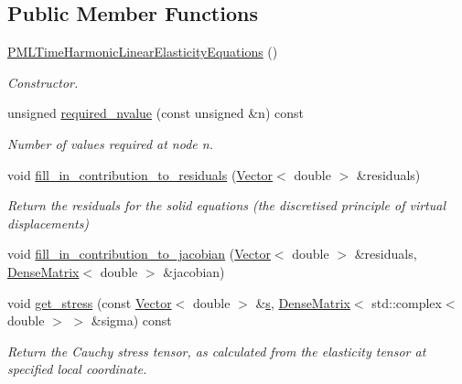 \subsection*{Public Member Functions}
\begin{DoxyCompactItemize}
\item 
\hyperlink{classoomph_1_1PMLTimeHarmonicLinearElasticityEquations_a9e9038f4d7f8a3520ba5cc01dc3f113d}{P\+M\+L\+Time\+Harmonic\+Linear\+Elasticity\+Equations} ()
\begin{DoxyCompactList}\small\item\em Constructor. \end{DoxyCompactList}\item 
unsigned \hyperlink{classoomph_1_1PMLTimeHarmonicLinearElasticityEquations_a717fe9dac9457f652bb49872648525eb}{required\+\_\+nvalue} (const unsigned \&n) const
\begin{DoxyCompactList}\small\item\em Number of values required at node n. \end{DoxyCompactList}\item 
void \hyperlink{classoomph_1_1PMLTimeHarmonicLinearElasticityEquations_ac4df72a2abd8ce1c7d578d79b4bda828}{fill\+\_\+in\+\_\+contribution\+\_\+to\+\_\+residuals} (\hyperlink{classoomph_1_1Vector}{Vector}$<$ double $>$ \&residuals)
\begin{DoxyCompactList}\small\item\em Return the residuals for the solid equations (the discretised principle of virtual displacements) \end{DoxyCompactList}\item 
void \hyperlink{classoomph_1_1PMLTimeHarmonicLinearElasticityEquations_af058d2d4b1c5aa77f99a1609fbe69167}{fill\+\_\+in\+\_\+contribution\+\_\+to\+\_\+jacobian} (\hyperlink{classoomph_1_1Vector}{Vector}$<$ double $>$ \&residuals, \hyperlink{classoomph_1_1DenseMatrix}{Dense\+Matrix}$<$ double $>$ \&jacobian)
\item 
void \hyperlink{classoomph_1_1PMLTimeHarmonicLinearElasticityEquations_a81f0d12fb13d9fe3d1daab709b3bd012}{get\+\_\+stress} (const \hyperlink{classoomph_1_1Vector}{Vector}$<$ double $>$ \&\hyperlink{cfortran_8h_ab7123126e4885ef647dd9c6e3807a21c}{s}, \hyperlink{classoomph_1_1DenseMatrix}{Dense\+Matrix}$<$ std\+::complex$<$ double $>$ $>$ \&sigma) const
\begin{DoxyCompactList}\small\item\em Return the Cauchy stress tensor, as calculated from the elasticity tensor at specified local coordinate. \end{DoxyCompactList}\item 

\end{DoxyCompactItemize}
